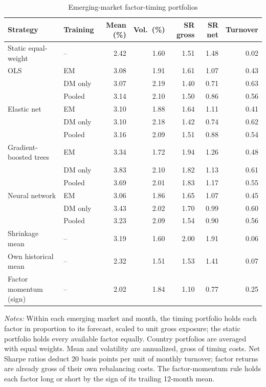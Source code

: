 \begin{table}[!ht]
\centering\small\setlength{\tabcolsep}{5pt}
\caption{Emerging-market factor-timing portfolios}
\label{tab:portfolios}
\begin{tabular}{llrrrrr}
\toprule
Strategy & Training & Mean (\%) & Vol.\ (\%) & SR gross & SR net & Turnover \\
\midrule
Static equal-weight & -- & 2.42 & 1.60 & 1.51 & 1.48 & 0.02 \\
\addlinespace
OLS & EM & 3.08 & 1.91 & 1.61 & 1.07 & 0.43 \\
 & DM only & 3.07 & 2.19 & 1.40 & 0.71 & 0.63 \\
 & Pooled & 3.14 & 2.10 & 1.50 & 0.86 & 0.56 \\
\addlinespace[2pt]
Elastic net & EM & 3.10 & 1.88 & 1.64 & 1.11 & 0.41 \\
 & DM only & 3.10 & 2.18 & 1.42 & 0.74 & 0.62 \\
 & Pooled & 3.16 & 2.09 & 1.51 & 0.88 & 0.54 \\
\addlinespace[2pt]
Gradient-boosted trees & EM & 3.34 & 1.72 & 1.94 & 1.26 & 0.48 \\
 & DM only & 3.83 & 2.10 & 1.82 & 1.13 & 0.61 \\
 & Pooled & 3.69 & 2.01 & 1.83 & 1.17 & 0.55 \\
\addlinespace[2pt]
Neural network & EM & 3.06 & 1.86 & 1.65 & 1.07 & 0.45 \\
 & DM only & 3.43 & 2.02 & 1.70 & 0.99 & 0.60 \\
 & Pooled & 3.23 & 2.09 & 1.54 & 0.90 & 0.56 \\
\addlinespace
Shrinkage mean & -- & 3.19 & 1.60 & 2.00 & 1.91 & 0.06 \\
Own historical mean & -- & 2.32 & 1.51 & 1.53 & 1.41 & 0.07 \\
Factor momentum (sign) & -- & 2.02 & 1.84 & 1.10 & 0.77 & 0.25 \\
\bottomrule
\end{tabular}

\vspace{4pt}
\begin{minipage}{0.95\linewidth}\footnotesize
\textit{Notes:} Within each emerging market and month, the timing portfolio holds each factor in proportion to its forecast, scaled to unit gross exposure; the static portfolio holds every available factor equally. Country portfolios are averaged with equal weights. Mean and volatility are annualized, gross of timing costs. Net Sharpe ratios deduct 20 basis points per unit of monthly turnover; factor returns are already gross of their own rebalancing costs. The factor-momentum rule holds each factor long or short by the sign of its trailing 12-month mean.
\end{minipage}
\end{table}
